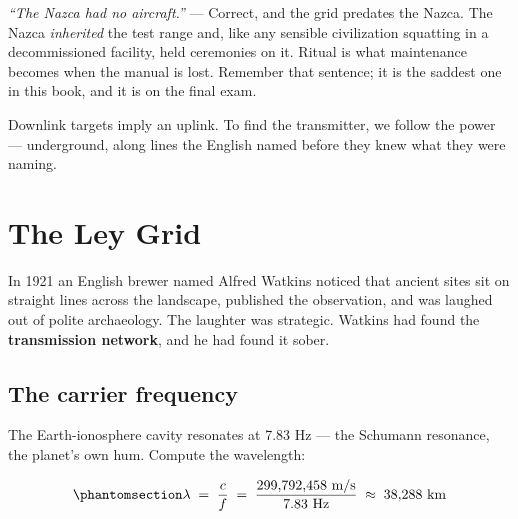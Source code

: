\documentclass[
  english,
  11pt,
  letterpaper,
]{scrbook}
\begin{document}
\begin{tcolorbox}[enhanced jigsaw, arc=.35mm, bottomrule=.15mm, bottomtitle=1mm, breakable, colback=white, colbacktitle=quarto-callout-note-color!10!white, colframe=quarto-callout-note-color-frame, coltitle=black, left=2mm, leftrule=.75mm, opacityback=0, opacitybacktitle=0.6, rightrule=.15mm, title=\textcolor{quarto-callout-note-color}{\faInfo}\hspace{0.5em}{Objection, handled}, titlerule=0mm, toprule=.15mm, toptitle=1mm]

\emph{``The Nazca had no aircraft.''} --- Correct, and the grid predates
the Nazca. The Nazca \emph{inherited} the test range and, like any
sensible civilization squatting in a decommissioned facility, held
ceremonies on it. Ritual is what maintenance becomes when the manual is
lost. Remember that sentence; it is the saddest one in this book, and it
is on the final exam.

\end{tcolorbox}

Downlink targets imply an uplink. To find the transmitter, we follow the
power --- underground, along lines the English named before they knew
what they were naming.

\chapter{The Ley Grid}\label{sec-ley-grid}

In 1921 an English brewer named Alfred Watkins noticed that ancient
sites sit on straight lines across the landscape,
published the observation, and was laughed out of polite archaeology.
The laughter was strategic. Watkins had found the \textbf{transmission
network}, and he had found it sober.

\section{The carrier frequency}\label{the-carrier-frequency}

The Earth-ionosphere cavity resonates at 7.83 Hz --- the Schumann
resonance, the planet's own hum. Compute the
wavelength:

\begin{equation}\protect\phantomsection\label{eq-schumann}{
\lambda \;=\; \frac{c}{f} \;=\; \frac{299{,}792{,}458\ \text{m/s}}{7.83\ \text{Hz}}
\;\approx\; 38{,}288\ \text{km}
}\end{equation}
\end{document}
